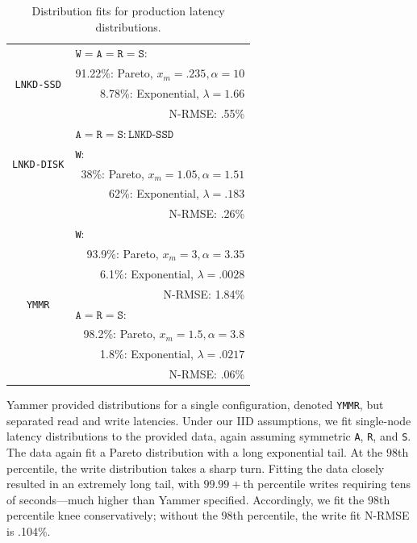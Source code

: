 \documentclass{vldb}
\begin{document}
\begin{table}
\centering
\begin{tabular}{|c|r|}
\hline
\multirow{4}{*}{\texttt{LNKD-SSD}} & \multicolumn{1}{|l|}{$\texttt{W} = \texttt{A}= \texttt{R} = \texttt{S}:$} \\
& 91.22\%: Pareto, $x_m=.235, \alpha=10$\\
& 8.78\%: Exponential, $\lambda = 1.66$ \\
& N-RMSE: .55\%\\\hline
\multirow{4}{*}{\texttt{LNKD-DISK}} & \multicolumn{1}{|l|}{$\texttt{A}= \texttt{R} = \texttt{S}: \texttt{LNKD-SSD}$}\\\cline{2-2}
& \multicolumn{1}{|l|}{\texttt{W}:}\\
& 38\%: Pareto, $x_m=1.05, \alpha=1.51$\\
& \hfill 62\%: Exponential, $\lambda = .183$ \\
& N-RMSE: .26\%\\
\hline
\multirow{8}{*}{\texttt{YMMR}} & \multicolumn{1}{|l|}{\texttt{W}:} \\
& 93.9\%: Pareto, $x_m=3, \alpha=3.35$\\
& 6.1\%: Exponential, $\lambda = .0028$ \\
& N-RMSE: 1.84\%\\\cline{2-2}
& \multicolumn{1}{|l|}{$\texttt{A}= \texttt{R} = \texttt{S}:$}\\
& 98.2\%: Pareto, $x_m=1.5, \alpha=3.8$\\
& 1.8\%: Exponential, $\lambda=.0217$\\
& N-RMSE: .06\%\\
\hline
\end{tabular}
\vspace{-6pt}
\caption{Distribution fits for production latency distributions.}
\vspace{-12pt}
\label{table:fits}
\end{table}


Yammer provided distributions for a single configuration, denoted
\texttt{YMMR}, but separated read and write latencies.  Under our IID
assumptions, we fit single-node latency distributions to the provided
data, again assuming symmetric \texttt{A}, \texttt{R}, and \texttt{S}.
The data again fit a Pareto distribution with a long exponential tail.
At the $98$th percentile, the write distribution takes a sharp turn.
Fitting the data closely resulted in an extremely long tail, with
$99.99+$th percentile writes requiring tens of seconds---much higher
than Yammer specified.  Accordingly, we fit the $98$th percentile knee
conservatively; without the $98$th percentile, the write fit N-RMSE is
.104\%.
\end{document}

